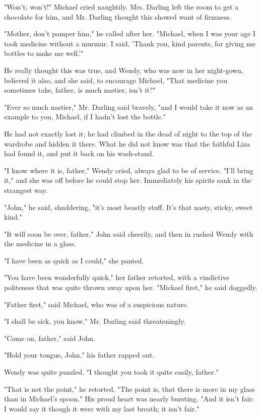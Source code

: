 "Won't; won't!" Michael cried naughtily. Mrs. Darling left the room to get
a chocolate for him, and Mr. Darling thought this showed want of firmness.


"Mother, don't pamper him," he called after her. "Michael, when I was your
age I took medicine without a murmur. I said, 'Thank you, kind parents,
for giving me bottles to make me well.'"


He really thought this was true, and Wendy, who was now in her night-gown,
believed it also, and she said, to encourage Michael, "That medicine you
sometimes take, father, is much nastier, isn't it?"


"Ever so much nastier," Mr. Darling said bravely, "and I would take it now
as an example to you, Michael, if I hadn't lost the bottle."


He had not exactly lost it; he had climbed in the dead of night to the top
of the wardrobe and hidden it there. What he did not know was that the
faithful Liza had found it, and put it back on his wash-stand.


"I know where it is, father," Wendy cried, always glad to be of service.
"I'll bring it," and she was off before he could stop her. Immediately his
spirits sank in the strangest way.


"John," he said, shuddering, "it's most beastly stuff. It's that nasty,
sticky, sweet kind."


"It will soon be over, father," John said cheerily, and then in rushed
Wendy with the medicine in a glass.


"I have been as quick as I could," she panted.


"You have been wonderfully quick," her father retorted, with a vindictive
politeness that was quite thrown away upon her. "Michael first," he said
doggedly.


"Father first," said Michael, who was of a suspicious nature.


"I shall be sick, you know," Mr. Darling said threateningly.


"Come on, father," said John.


"Hold your tongue, John," his father rapped out.


Wendy was quite puzzled. "I thought you took it quite easily, father."


"That is not the point," he retorted. "The point is, that there is more in
my glass than in Michael's spoon." His proud heart was nearly bursting.
"And it isn't fair: I would say it though it were with my last breath; it
isn't fair."


